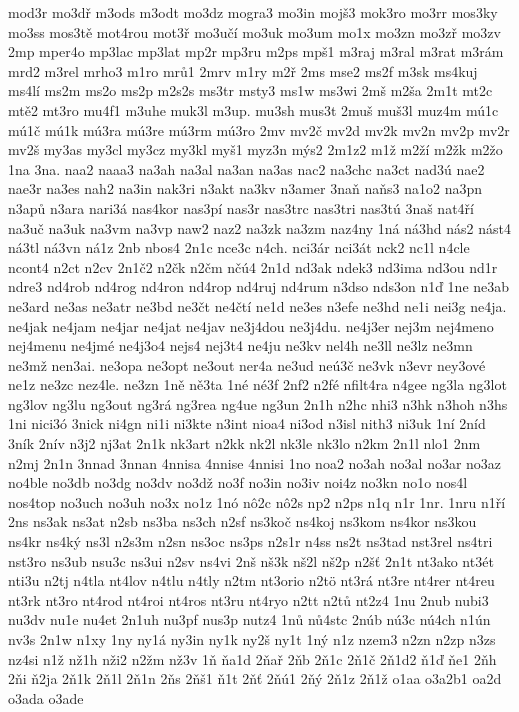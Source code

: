 {mod3r
mo3dř
m3ods
m3odt
mo3dz
mogra3
mo3in
mojš3
mok3ro
mo3rr
mos3ky
mo3ss
mos3tě
mot4rou
mot3ř
mo3učí
mo3uk
mo3um
mo1x
mo3zn
mo3zř
mo3zv
2mp
mper4o
mp3lac
mp3lat
mp2r
mp3ru
m2ps
mpš1
m3raj
m3ral
m3rat
m3rám
mrd2
m3rel
mrho3
m1ro
mrů1
2mrv
m1ry
m2ř
2ms
mse2
ms2f
m3sk
ms4kuj
ms4lí
ms2m
ms2o
ms2p
m2s2s
ms3tr
msty3
ms1w
ms3wi
2mš
m2ša
2m1t
mt2c
mtě2
mt3ro
mu4f1
m3uhe
muk3l
m3up.
mu3sh
mus3t
2muš
muš3l
muz4m
mú1c
mú1č
mú1k
mú3ra
mú3re
mú3rm
mú3ro
2mv
mv2č
mv2d
mv2k
mv2n
mv2p
mv2r
mv2š
my3as
my3cl
my3cz
my3kl
myš1
myz3n
mýs2
2m1z2
m1ž
m2ží
m2žk
m2žo
1na
3na.
naa2
naaa3
na3ah
na3al
na3an
na3as
nac2
na3chc
na3ct
nad3ú
nae2
nae3r
na3es
nah2
na3in
nak3ri
n3akt
na3kv
n3amer
3naň
naňs3
na1o2
na3pn
n3apů
n3ara
nari3á
nas4kor
nas3pí
nas3r
nas3trc
nas3tri
nas3tú
3naš
nat4ří
na3uč
na3uk
na3vm
na3vp
naw2
naz2
na3zk
na3zm
naz4ny
1ná
ná3hd
nás2
nást4
ná3tl
ná3vn
ná1z
2nb
nbos4
2n1c
nce3c
n4ch.
nci3ár
nci3át
nck2
nc1l
n4cle
ncont4
n2ct
n2cv
2n1č2
n2čk
n2čm
nčú4
2n1d
nd3ak
ndek3
nd3ima
nd3ou
nd1r
ndre3
nd4rob
nd4rog
nd4ron
nd4rop
nd4ruj
nd4rum
n3dso
nds3on
n1ď
1ne
ne3ab
ne3ard
ne3as
ne3atr
ne3bd
ne3čt
ne4čtí
ne1d
ne3es
n3efe
ne3hd
ne1i
nei3g
ne4ja.
ne4jak
ne4jam
ne4jar
ne4jat
ne4jav
ne3j4dou
ne3j4du.
ne4j3er
nej3m
nej4meno
nej4menu
ne4jmé
ne4j3o4
nejs4
nej3t4
ne4ju
ne3kv
nel4h
ne3ll
ne3lz
ne3mn
ne3mž
nen3ai.
ne3opa
ne3opt
ne3out
ner4a
ne3ud
neú3č
ne3vk
n3evr
ney3ové
ne1z
ne3zc
nez4le.
ne3zn
1ně
ně3ta
1né
né3f
2nf2
n2fé
nfilt4ra
n4gee
ng3la
ng3lot
ng3lov
ng3lu
ng3out
ng3rá
ng3rea
ng4ue
ng3un
2n1h
n2hc
nhi3
n3hk
n3hoh
n3hs
1ni
nici3ó
3nick
ni4gn
ni1i
ni3kte
n3int
nioa4
ni3od
n3isl
nith3
ni3uk
1ní
2níd
3ník
2nív
n3j2
nj3at
2n1k
nk3art
n2kk
nk2l
nk3le
nk3lo
n2km
2n1l
nlo1
2nm
n2mj
2n1n
3nnad
3nnan
4nnisa
4nnise
4nnisi
1no
noa2
no3ah
no3al
no3ar
no3az
no4ble
no3db
no3dg
no3dv
no3dž
no3f
no3in
no3iv
noi4z
no3kn
no1o
nos4l
nos4top
no3uch
no3uh
no3x
no1z
1nó
nô2c
nô2s
np2
n2ps
n1q
n1r
1nr.
1nru
n1ří
2ns
ns3ak
ns3at
n2sb
ns3ba
ns3ch
n2sf
ns3koč
ns4koj
ns3kom
ns4kor
ns3kou
ns4kr
ns4ký
ns3l
n2s3m
n2sn
ns3oc
ns3ps
n2s1r
n4ss
ns2t
ns3tad
nst3rel
ns4tri
nst3ro
ns3ub
nsu3c
ns3ui
n2sv
ns4vi
2nš
nš3k
nš2l
nš2p
n2šť
2n1t
nt3ako
nt3ét
nti3u
n2tj
n4tla
nt4lov
n4tlu
n4tly
n2tm
nt3orio
n2tö
nt3rá
nt3re
nt4rer
nt4reu
nt3rk
nt3ro
nt4rod
nt4roi
nt4ros
nt3ru
nt4ryo
n2tt
n2tů
nt2z4
1nu
2nub
nubi3
nu3dv
nu1e
nu4et
2n1uh
nu3pf
nus3p
nutz4
1nů
nů4stc
2núb
nú3c
nú4ch
n1ún
nv3s
2n1w
n1xy
1ny
ny1á
ny3in
ny1k
ny2š
ny1t
1ný
n1z
nzem3
n2zn
n2zp
n3zs
nz4si
n1ž
nž1h
nži2
n2žm
nž3v
1ň
ňa1d
2ňař
2ňb
2ň1c
2ň1č
2ň1d2
ň1ď
ňe1
2ňh
2ňi
ň2ja
2ň1k
2ň1l
2ň1n
2ňs
2ňš1
ň1t
2ňť
2ňú1
2ňý
2ň1z
2ň1ž
o1aa
o3a2b1
oa2d
o3ada
o3ade
}
